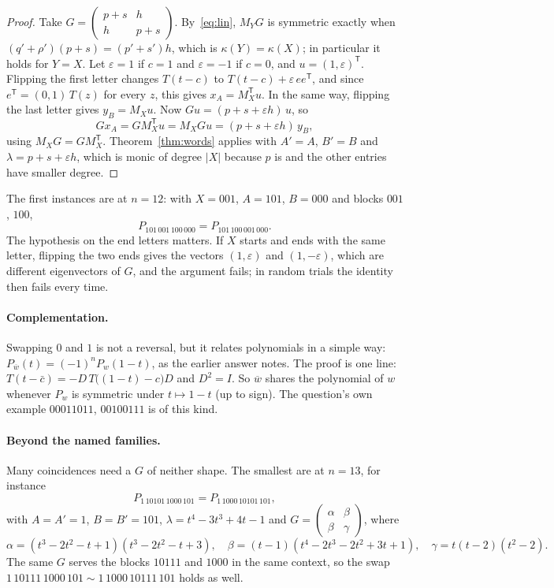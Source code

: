 \documentclass[11pt]{article}
\theoremstyle{remark}
\newcommand{\T}{^{\mathsf T}}
\begin{document}
\begin{proof}
Take $G=\left(\begin{smallmatrix}p+s&h\\ h&p+s\end{smallmatrix}\right)$. By~\eqref{eq:lin}, $M_YG$ is symmetric exactly
when $(q'+\rho')(p+s)=(p'+s')h$, which is $\kappa(Y)=\kappa(X)$; in particular it holds for $Y=X$. Let $\varepsilon=1$
if $c=1$ and $\varepsilon=-1$ if $c=0$, and $u=(1,\varepsilon)\T$. Flipping the first letter changes $T(t-c)$ to
$T(t-c)+\varepsilon\,ee\T$, and since $e\T=(0,1)\,T(z)$ for every $z$, this gives $x_A=M_X\T u$. In the same way,
flipping the last letter gives $y_B=M_Xu$. Now $Gu=(p+s+\varepsilon h)\,u$, so
\[
Gx_A=GM_X\T u=M_XGu=(p+s+\varepsilon h)\,y_B ,
\]
using $M_XG=GM_X\T$. Theorem~\ref{thm:words} applies with $A'=A$, $B'=B$ and $\lambda=p+s+\varepsilon h$, which is
monic of degree $|X|$ because $p$ is and the other entries have smaller degree.
\end{proof}

The first instances are at $n=12$: with $X=001$, $A=101$, $B=000$ and blocks $001$, $100$,
\[
P_{101\,001\,100\,000}=P_{101\,100\,001\,000}.
\]
The hypothesis on the end letters matters. If $X$ starts and ends with the same letter, flipping the two ends gives
the vectors $(1,\varepsilon)$ and $(1,-\varepsilon)$, which are different eigenvectors of $G$, and the argument fails;
in random trials the identity then fails every time.

\paragraph{Complementation.} Swapping $0$ and $1$ is not a reversal, but it relates polynomials in a simple way:
$P_{\overline w}(t)=(-1)^nP_w(1-t)$, as the earlier answer notes. The proof is one line:
$T(t-\bar c)=-D\,T\bigl((1-t)-c\bigr)D$ and $D^2=I$. So $\overline w$ shares the polynomial of $w$ whenever $P_w$ is
symmetric under $t\mapsto1-t$ (up to sign). The question's own example $00011011$, $00100111$ is of this kind.

\paragraph{Beyond the named families.} Many coincidences need a $G$ of neither shape. The smallest are at $n=13$, for
instance
\[
P_{1\,10101\,1000\,101}=P_{1\,1000\,10101\,101},
\]
with $A=A'=1$, $B=B'=101$, $\lambda=t^4-3t^3+4t-1$ and
$G=\left(\begin{smallmatrix}\alpha&\beta\\ \beta&\gamma\end{smallmatrix}\right)$, where
\[
\alpha=(t^3-2t^2-t+1)(t^3-2t^2-t+3),\quad \beta=(t-1)(t^4-2t^3-2t^2+3t+1),\quad \gamma=t(t-2)(t^2-2).
\]
The same $G$ serves the blocks $10111$ and $1000$ in the same context, so the swap $1\,10111\,1000\,101\sim
1\,1000\,10111\,101$ holds as well.
\end{document}
